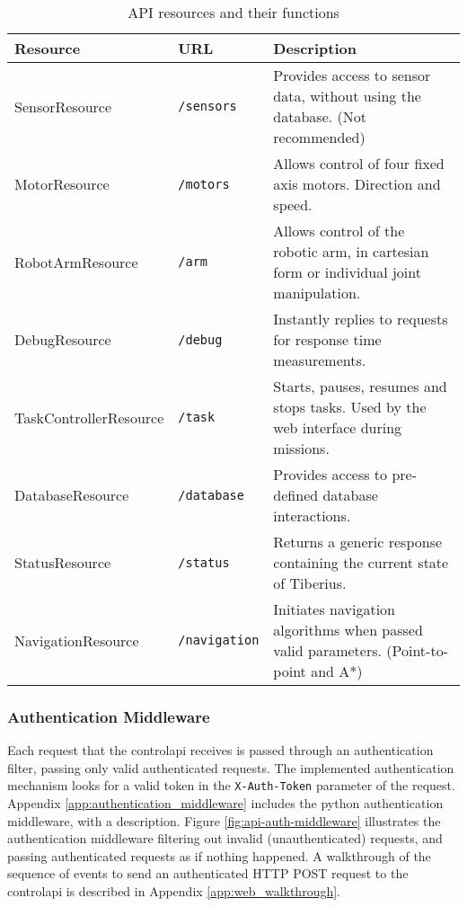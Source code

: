 \begin{table}[!htb]
\centering
\begin{tabular}{|l|l|p{6cm}|}
\hline
\textbf{Resource}      & \textbf{URL} & \textbf{Description}                                                                   \\ \hline
SensorResource         & \texttt{/sensors}     & Provides access to sensor data, without using the database. (Not recommended)          \\ \hline
MotorResource          & \texttt{/motors}      & Allows control of four fixed axis motors. Direction and speed.                         \\ \hline
RobotArmResource       & \texttt{/arm}         & Allows control of the robotic arm, in cartesian form or individual joint manipulation. \\ \hline
DebugResource          & \texttt{/debug}       & Instantly replies to requests for response time measurements.                          \\ \hline
TaskControllerResource & \texttt{/task}        & Starts, pauses, resumes and stops tasks. Used by the web interface during missions.    \\ \hline
DatabaseResource       & \texttt{/database}    & Provides access to pre-defined database interactions.                                  \\ \hline
StatusResource         & \texttt{/status}      & Returns a generic response containing the current state of Tiberius.                   \\ \hline
NavigationResource     & \texttt{/navigation}  & Initiates navigation algorithms when passed valid parameters. (Point-to-point and A*)  \\ \hline
\end{tabular}
\caption{API resources and their functions}
\label{tab:web_api_resources}
\end{table}

\subsubsection{Authentication Middleware}
Each request that the \gls{controlapi} receives is passed through an authentication filter, passing only valid authenticated requests. The implemented authentication mechanism looks for a valid token in the \texttt{X-Auth-Token} parameter of the request. Appendix \ref{app:authentication_middleware} includes the \gls{python} authentication middleware, with a description.
\newline
Figure \ref{fig:api-auth-middleware} illustrates the authentication middleware filtering out invalid (unauthenticated) requests, and passing authenticated requests as if nothing happened. A walkthrough of the sequence of events to send an authenticated \gls{HTTP} \gls{POST} request to the \gls{controlapi} is described in Appendix \ref{app:web_walkthrough}.

